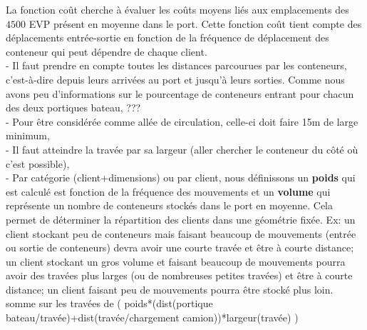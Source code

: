 \documentclass{article}
\begin{document}
La fonction coût cherche à évaluer les coûts moyens liés aux emplacements des $4500$ EVP présent en moyenne dans le port. Cette fonction coût tient compte des déplacements entrée-sortie en fonction de la fréquence de déplacement des conteneur qui peut dépendre de chaque client.\\


- Il faut prendre en compte toutes les distances parcourues par les conteneurs, c'est-à-dire depuis leurs arrivées au port et jusqu'à leurs sorties. Comme nous avons peu d'informations sur le pourcentage de conteneurs entrant pour chacun des deux portiques bateau, ???\\
- Pour être considérée comme allée de circulation, celle-ci doit faire 15m de large minimum, \\
- Il faut atteindre la travée par sa largeur (aller chercher le conteneur du c\^oté où c'est possible), \\
- Par catégorie (client+dimensions) ou par client, nous définissons un \textbf{poids} qui est calculé est fonction de la fréquence des mouvements et un \textbf{volume} qui représente un nombre de conteneurs stockés dans le port en moyenne. Cela permet de déterminer la répartition des clients dans une géométrie fixée. Ex: un client stockant peu de conteneurs mais faisant beaucoup de mouvements (entrée ou sortie de conteneurs) devra avoir une courte travée et être à courte distance; un client stockant un gros volume et faisant beaucoup de mouvements pourra avoir des travées plus larges (ou de nombreuses petites travées) et être à courte distance; un client faisant peu de mouvements pourra être stocké plus loin. \\ %


somme sur les travées de (  poids*(dist(portique bateau/travée)+dist(travée/chargement camion))*largeur(travée)  ) \\
\end{document}
